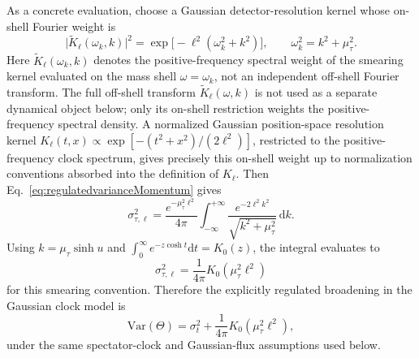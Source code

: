 \documentclass[pdflatex,sn-mathphys-num]{sn-jnl}
\theoremstyle{thmstylethree}
\theoremstyle{thmstyleone}
\theoremstyle{thmstyletwo}
\numberwithin{equation}{section}
\newcommand{\dd}{\mathrm{d}}
\begin{document}
        As a concrete evaluation, choose a Gaussian detector-resolution kernel whose on-shell Fourier weight is
        \begin{equation}
            \bigl|\widetilde K_\ell(\omega_k,k)\bigr|^2
            =
            \exp\!\big[-\ell^2(\omega_k^2+k^2)\big],
            \qquad
            \omega_k^2=k^2+\mu_\tau^2 .
            \label{eq:gaussianKernelWeight}
        \end{equation}
        Here $\widetilde K_\ell(\omega_k,k)$ denotes the positive-frequency spectral weight of the smearing kernel evaluated on the mass shell $\omega=\omega_k$, not an independent off-shell Fourier transform. The full off-shell transform $\widetilde K_\ell(\omega,k)$ is not used as a separate dynamical object below; only its on-shell restriction weights the positive-frequency spectral density. A normalized Gaussian position-space resolution kernel $K_\ell(t,x)\propto\exp[-(t^2+x^2)/(2\ell^2)]$, restricted to the positive-frequency clock spectrum, gives precisely this on-shell weight up to normalization conventions absorbed into the definition of $K_\ell$.
        Then Eq.~\eqref{eq:regulatedvarianceMomentum} gives
        \begin{equation}
            \sigma_{\tau,\ell}^{2}
            =
            \frac{e^{-\mu_\tau^2\ell^2}}{4\pi}
            \int_{-\infty}^{+\infty}
            \frac{e^{-2\ell^2 k^2}}{\sqrt{k^2+\mu_\tau^2}}\,\dd k .
            \label{eq:gaussianVarianceIntegral}
        \end{equation}
        Using $k=\mu_\tau\sinh u$ and
        $\int_0^\infty e^{-z\cosh t}\dd t=K_0(z)$, the integral evaluates to
        \begin{equation}
            \boxed{
            \sigma_{\tau,\ell}^{2}
            =
            \frac{1}{4\pi}
            K_0(\mu_\tau^2\ell^2)
            }
            \label{eq:gaussianVarianceClosed}
        \end{equation}
        for this smearing convention. Therefore the explicitly regulated broadening in the Gaussian clock model is
        \begin{equation}
            \mathrm{Var}(\Theta)
            =
            \sigma_t^2+\frac{1}{4\pi}K_0(\mu_\tau^2\ell^2),
            \label{eq:explicitBroadening}
        \end{equation}
        under the same spectator-clock and Gaussian-flux assumptions used below.
\end{document}
